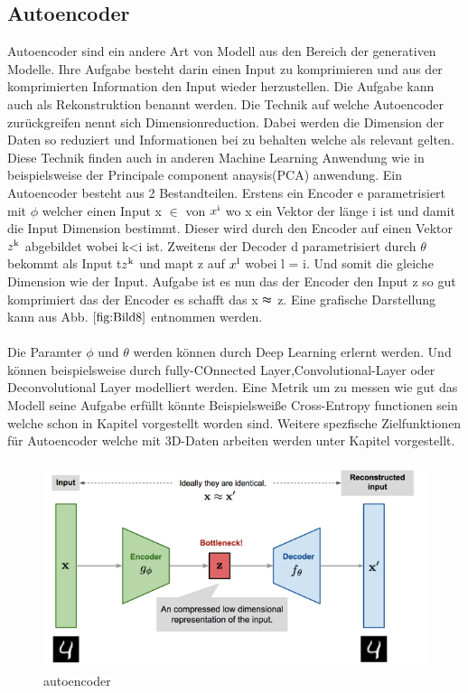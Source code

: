 \documentclass{llncs}
\begin{document}
\subsection{Autoencoder}

Autoencoder sind ein andere Art von Modell aus den Bereich der generativen Modelle. Ihre Aufgabe besteht darin einen Input zu komprimieren und aus der komprimierten Information den Input wieder herzustellen. Die Aufgabe kann auch als Rekonstruktion benannt werden. Die Technik auf welche Autoencoder zurückgreifen nennt sich Dimensionreduction. Dabei werden die Dimension der Daten so reduziert und Informationen bei zu behalten welche als relevant gelten. Diese Technik finden auch in anderen Machine Learning Anwendung wie in beispielsweise der Principale component anaysis(PCA) anwendung.  Ein Autoencoder besteht aus 2 Bestandteilen. Erstens ein Encoder e parametrisiert mit $\phi$ welcher einen Input x $\in$ von $x\textsuperscript{i}$ wo x ein Vektor der länge i ist und damit die Input Dimension bestimmt. Dieser wird durch den Encoder auf einen Vektor $z\textsuperscript{k}$ abgebildet wobei k<i ist.  Zweitens der Decoder d parametrisiert durch  $\theta$ bekommt als Input t$z\textsuperscript{k}$ und mapt z auf $x\textsuperscript{l}$ wobei l = i. Und somit die gleiche Dimension wie der Input. Aufgabe ist es nun das der Encoder den Input z so gut komprimiert das der  Encoder es schafft das x $\thickapprox$ z. Eine grafische Darstellung kann aus Abb. $\ref{fig:Bild8}$ entnommen werden. 
\\\\
Die Paramter $\phi$ und $\theta$ werden können durch Deep Learning erlernt werden. Und können beispielsweise durch fully-COnnected Layer,Convolutional-Layer oder Deconvolutional Layer modelliert werden. Eine Metrik um zu messen wie gut das Modell seine Aufgabe erfüllt könnte Beispielsweiße Cross-Entropy functionen sein welche schon in Kapitel vorgestellt worden sind. Weitere spezfische Zielfunktionen für Autoencoder welche mit 3D-Daten arbeiten werden unter Kapitel vorgestellt.

\begin{figure}[htbp] 
	\centering
	\includegraphics[width=1.0\textwidth]{autoencoder.png}
	\caption{autoencoder}
	\label{fig:Bild8}
\end{figure}
\end{document}
